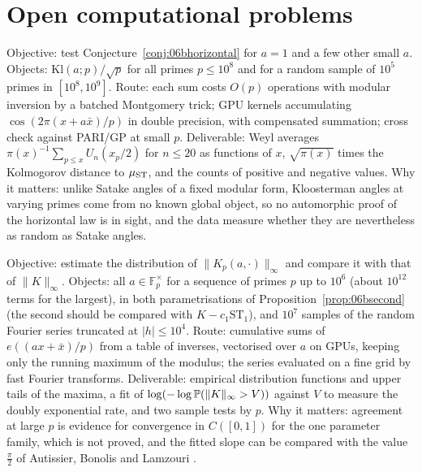 \section{Open computational problems}

\begin{compproblem}
Objective: test Conjecture~\ref{conj:06bhorizontal} for $a=1$ and a few other small $a$. Objects: $\mathrm{Kl}(a;p)/\sqrt p$ for all primes $p\le10^8$ and for a random sample of $10^5$ primes in $[10^8,10^9]$. Route: each sum costs $O(p)$ operations with modular inversion by a batched Montgomery trick; GPU kernels accumulating $\cos(2\pi(x+a\bar x)/p)$ in double precision, with compensated summation; cross check against PARI/GP at small $p$. Deliverable: Weyl averages $\pi(x)^{-1}\sum_{p\le x}U_n(x_p/2)$ for $n\le20$ as functions of $x$, $\sqrt{\pi(x)}$ times the Kolmogorov distance to $\mu_{\mathrm{ST}}$, and the counts of positive and negative values. Why it matters: unlike Satake angles of a fixed modular form, Kloosterman angles at varying primes come from no known global object, so no automorphic proof of the horizontal law is in sight, and the data measure whether they are nevertheless as random as Satake angles.
\end{compproblem}

\begin{compproblem}
Objective: estimate the distribution of $\|K_p(a,\cdot)\|_\infty$ and compare it with that of $\|K\|_\infty$. Objects: all $a\in\mathbb{F}_p^\times$ for a sequence of primes $p$ up to $10^6$ (about $10^{12}$ terms for the largest), in both parametrisations of Proposition~\ref{prop:06bsecond} (the second should be compared with $K-c_1\mathrm{ST}_1$), and $10^7$ samples of the random Fourier series truncated at $|h|\le10^4$. Route: cumulative sums of $e((ax+\bar x)/p)$ from a table of inverses, vectorised over $a$ on GPUs, keeping only the running maximum of the modulus; the series evaluated on a fine grid by fast Fourier transforms. Deliverable: empirical distribution functions and upper tails of the maxima, a fit of $\log(-\log\mathbb{P}(\|K\|_\infty>V))$ against $V$ to measure the doubly exponential rate, and two sample tests by $p$. Why it matters: agreement at large $p$ is evidence for convergence in $C([0,1])$ for the one parameter family, which is not proved, and the fitted slope can be compared with the value $\frac\pi2$ of Autissier, Bonolis and Lamzouri \cite{abl2021}.
\end{compproblem}

